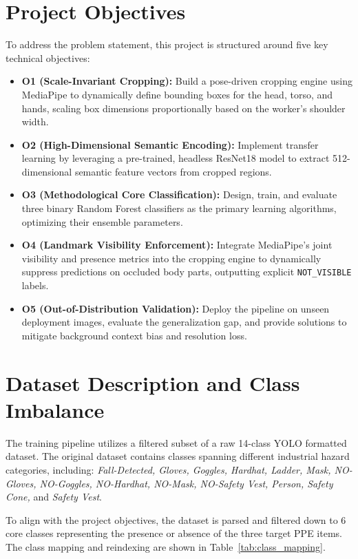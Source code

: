 \documentclass[11pt,a4paper]{article}
\begin{document}
\section{Project Objectives}
To address the problem statement, this project is structured around five key technical objectives:
\begin{itemize}
\item \textbf{O1 (Scale-Invariant Cropping):} Build a pose-driven cropping engine using MediaPipe to dynamically define bounding boxes for the head, torso, and hands, scaling box dimensions proportionally based on the worker's shoulder width.
\item \textbf{O2 (High-Dimensional Semantic Encoding):} Implement transfer learning by leveraging a pre-trained, headless ResNet18 model to extract 512-dimensional semantic feature vectors from cropped regions.
\item \textbf{O3 (Methodological Core Classification):} Design, train, and evaluate three binary Random Forest classifiers as the primary learning algorithms, optimizing their ensemble parameters.
\item \textbf{O4 (Landmark Visibility Enforcement):} Integrate MediaPipe's joint visibility and presence metrics into the cropping engine to dynamically suppress predictions on occluded body parts, outputting explicit \texttt{NOT\_VISIBLE} labels.
\item \textbf{O5 (Out-of-Distribution Validation):} Deploy the pipeline on unseen deployment images, evaluate the generalization gap, and provide solutions to mitigate background context bias and resolution loss.
\end{itemize}
\section{Dataset Description and Class Imbalance}
The training pipeline utilizes a filtered subset of a raw 14-class YOLO formatted dataset. The original dataset contains classes spanning different industrial hazard categories, including: \textit{Fall-Detected, Gloves, Goggles, Hardhat, Ladder, Mask, NO-Gloves, NO-Goggles, NO-Hardhat, NO-Mask, NO-Safety Vest, Person, Safety Cone,} and \textit{Safety Vest}.

To align with the project objectives, the dataset is parsed and filtered down to 6 core classes representing the presence or absence of the three target PPE items. The class mapping and reindexing are shown in Table~\ref{tab:class_mapping}.
\end{document}
